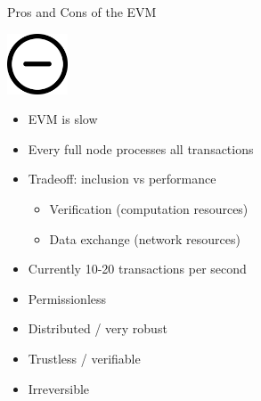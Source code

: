 \documentclass[]{beamer}
\begin{document}
\begin{frame}{Pros and Cons of the EVM}

\begin{minipage}{0.15\textwidth}
		\center
		\vspace{3.5em}
		\includegraphics[width=1.8cm]{../assets/images/minus.png}
		
		\vspace{3.5em}
		\vspace{0.5em}
	\end{minipage}
    \hfill
	\begin{minipage}{0.7\textwidth}
	\vspace{1em}

		\begin{itemize}
			\item<1-> EVM is slow
			\item<1-> Every full node processes all transactions
			\item<1-> Tradeoff: inclusion vs performance
			\begin{itemize}				
    				\item<1-> Verification (computation resources)
    				\item<1-> Data exchange (network resources)
  			\end{itemize}
			\item<1-> Currently 10-20 transactions per second	
		\end{itemize}
		\vspace{1em}

		\begin{itemize}
			\item<2-> Permissionless
			\item<2-> Distributed / very robust
			\item<2-> Trustless / verifiable
			\item<2-> Irreversible


		\end{itemize}
	\end{minipage}
	
	

\end{frame}
\end{document}

